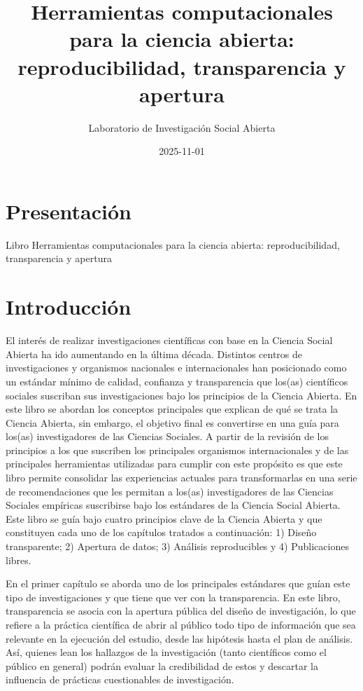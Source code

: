 \documentclass[
  spanish,
  a4paper,
  oneside]{scrbook}
\title{Herramientas computacionales para la ciencia abierta:
reproducibilidad, transparencia y apertura}
\author{Laboratorio de Investigación Social Abierta}
\date{2025-11-01}
\begin{document}
\frontmatter
\maketitle


\mainmatter
{}

\chapter*{Presentación}\label{presentaciuxf3n}


Libro Herramientas computacionales para la ciencia abierta:
reproducibilidad, transparencia y apertura


\chapter{Introducción}\label{introducciuxf3n}

El interés de realizar investigaciones científicas con base en la
Ciencia Social Abierta ha ido aumentando en la última década. Distintos
centros de investigaciones y organismos nacionales e internacionales han
posicionado como un estándar mínimo de calidad, confianza y
transparencia que los(as) científicos sociales suscriban sus
investigaciones bajo los principios de la Ciencia Abierta. En este libro
se abordan los conceptos principales que explican de qué se trata la
Ciencia Abierta, sin embargo, el objetivo final es convertirse en una
guía para los(as) investigadores de las Ciencias Sociales. A partir de
la revisión de los principios a los que suscriben los principales
organismos internacionales y de las principales herramientas utilizadas
para cumplir con este propósito es que este libro permite consolidar las
experiencias actuales para transformarlas en una serie de
recomendaciones que les permitan a los(as) investigadores de las
Ciencias Sociales empíricas suscribirse bajo los estándares de la
Ciencia Social Abierta. Este libro se guía bajo cuatro principios clave
de la Ciencia Abierta y que constituyen cada uno de los capítulos
tratados a continuación: 1) Diseño transparente; 2) Apertura de datos;
3) Análisis reproducibles y 4) Publicaciones libres.

En el primer capítulo se aborda uno de los principales estándares que
guían este tipo de investigaciones y que tiene que ver con la
transparencia. En este libro, transparencia se asocia con la apertura
pública del diseño de investigación, lo que refiere a la práctica
científica de abrir al público todo tipo de información que sea
relevante en la ejecución del estudio, desde las hipótesis hasta el plan
de análisis. Así, quienes lean los hallazgos de la investigación (tanto
científicos como el público en general) podrán evaluar la credibilidad
de estos y descartar la influencia de prácticas cuestionables de
investigación.
\end{document}
